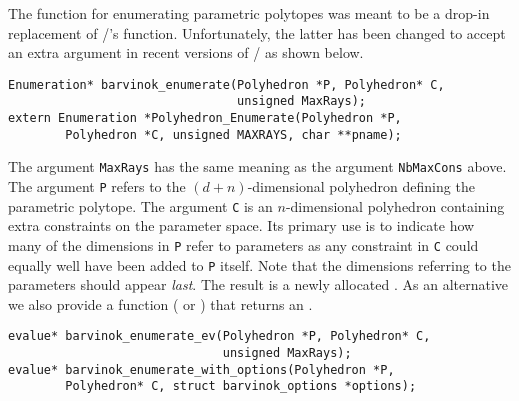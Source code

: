 The function  for enumerating
parametric polytopes was meant to be
a drop-in replacement of \PolyLib/'s 
function.
Unfortunately, the latter has been changed to
accept an extra argument in recent versions of \PolyLib/ as shown below.
\begin{verbatim}
Enumeration* barvinok_enumerate(Polyhedron *P, Polyhedron* C, 
                                unsigned MaxRays);
extern Enumeration *Polyhedron_Enumerate(Polyhedron *P,
	    Polyhedron *C, unsigned MAXRAYS, char **pname);
\end{verbatim}
The argument \verb+MaxRays+ has the same meaning as the argument
\verb+NbMaxCons+ above.
The argument \verb+P+ refers to the $(d+n)$-dimensional
polyhedron defining the parametric polytope.
The argument \verb+C+ is an $n$-dimensional polyhedron containing
extra constraints on the parameter space.
Its primary use is to indicate how many of the dimensions
in \verb+P+ refer to parameters as any constraint in \verb+C+
could equally well have been added to \verb+P+ itself.
Note that the dimensions referring to the parameters should
appear {\em last}.
The result is a newly allocated .
As an alternative we also provide a function 
( or
) that returns
an .
\begin{verbatim}
evalue* barvinok_enumerate_ev(Polyhedron *P, Polyhedron* C, 
                              unsigned MaxRays);
evalue* barvinok_enumerate_with_options(Polyhedron *P,
        Polyhedron* C, struct barvinok_options *options);
\end{verbatim}

